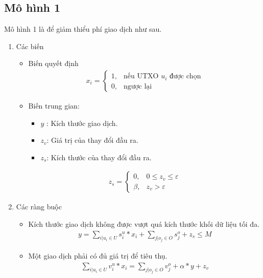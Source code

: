 \subsection{Mô hình 1}
Mô hình 1 là để giảm thiểu phí giao dịch như sau.
\begin{enumerate}
    \item Các biến
    \begin{itemize}
        \item Biến quyết định
        \begin{align}
            x_i = 
                \begin{cases}
                    1, & \text{nếu UTXO $u_i$ được chọn} \\
                    0, & \text{ngược lại}
                \end{cases}
        \end{align}

        \item Biến trung gian:
        \begin{itemize}
        \item $y$ : Kích thước giao dịch.
        \item $z_v$: Giá trị của thay đổi đầu ra.
        \item $z_s$: Kích thước của thay đổi đầu ra.
        \end{itemize}

        \begin{align}
			z_s = 
			\begin{cases}
				0, & 0\le z_v \le \varepsilon \\
				\beta, & z_v > \varepsilon
    		\end{cases}
    	\end{align}
    
    \end{itemize}
    
    \item Các ràng buộc
		\begin{itemize}
			
        \item Kích thước giao dịch không được vượt quá kích thước khối dữ liệu tối đa.
        \begin{align}
        y= \displaystyle \sum_{i|u_i\in U}s^u_i*x_i +\displaystyle \sum_{j|o_j\in O}s^o_j + z_s \le M
        \end{align}
       
        \item Một giao dịch phải có đủ giá trị để tiêu thụ.
        \begin{align}
        \displaystyle \sum_{i|u_i\in U}v^u_i*x_i = \displaystyle \sum_{j|o_j\in O}v^o_j + \alpha * y + z_v 
		\end{align}
		

\end{itemize}
\end{enumerate}
